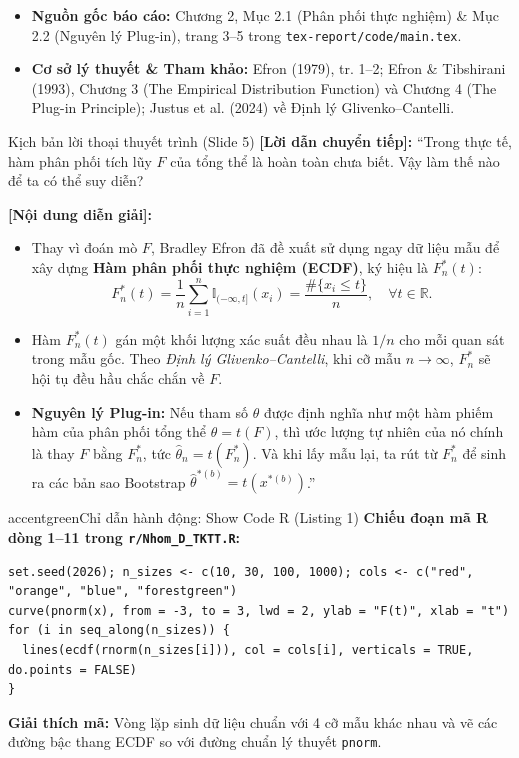 \documentclass[10pt,a4paper]{article}
\begin{document}
\begin{itemize}
    \item \textbf{Nguồn gốc báo cáo:} Chương 2, Mục 2.1 (Phân phối thực nghiệm) \& Mục 2.2 (Nguyên lý Plug-in), trang 3--5 trong \texttt{tex-report/code/main.tex}.
    \item \textbf{Cơ sở lý thuyết \& Tham khảo:} Efron (1979), tr. 1--2; Efron \& Tibshirani (1993), Chương 3 (The Empirical Distribution Function) và Chương 4 (The Plug-in Principle); Justus et al. (2024) về Định lý Glivenko--Cantelli.
\end{itemize}

\begin{scriptbox}{Kịch bản lời thoại thuyết trình (Slide 5)}
    \textbf{[Lời dẫn chuyển tiếp]:} ``Trong thực tế, hàm phân phối tích lũy $F$ của tổng thể là hoàn toàn chưa biết. Vậy làm thế nào để ta có thể suy diễn?
    
    \textbf{[Nội dung diễn giải]:} 
    \begin{itemize}
        \item Thay vì đoán mò $F$, Bradley Efron đã đề xuất sử dụng ngay dữ liệu mẫu để xây dựng \textbf{Hàm phân phối thực nghiệm (ECDF)}, ký hiệu là $F_n^*(t)$:
        \[
        F_n^*(t) = \frac{1}{n}\sum_{i=1}^n \mathbb{I}_{(-\infty,t]}(x_i) = \frac{\#\{x_i \le t\}}{n}, \quad \forall t \in \mathbb{R}.
        \]
        \item Hàm $F_n^*(t)$ gán một khối lượng xác suất đều nhau là $1/n$ cho mỗi quan sát trong mẫu gốc. Theo \textit{Định lý Glivenko--Cantelli}, khi cỡ mẫu $n \to \infty$, $F_n^*$ sẽ hội tụ đều hầu chắc chắn về $F$.
        \item \textbf{Nguyên lý Plug-in:} Nếu tham số $\theta$ được định nghĩa như một hàm phiếm hàm của phân phối tổng thể $\theta = t(F)$, thì ước lượng tự nhiên của nó chính là thay $F$ bằng $F_n^*$, tức $\hat\theta_n = t(F_n^*)$. Và khi lấy mẫu lại, ta rút từ $F_n^*$ để sinh ra các bản sao Bootstrap $\hat\theta^{*(b)} = t(x^{*(b)})$.''
    \end{itemize}
\end{scriptbox}

\begin{actionbox}{accentgreen}{Chỉ dẫn hành động: Show Code R (Listing 1)}
    \textbf{Chiếu đoạn mã R dòng 1--11 trong \texttt{r/Nhom\_D\_TKTT.R}:}
\begin{verbatim}
set.seed(2026); n_sizes <- c(10, 30, 100, 1000); cols <- c("red", "orange", "blue", "forestgreen")
curve(pnorm(x), from = -3, to = 3, lwd = 2, ylab = "F(t)", xlab = "t")
for (i in seq_along(n_sizes)) {
  lines(ecdf(rnorm(n_sizes[i])), col = cols[i], verticals = TRUE, do.points = FALSE)
}
\end{verbatim}
    \textbf{Giải thích mã:} Vòng lặp sinh dữ liệu chuẩn với 4 cỡ mẫu khác nhau và vẽ các đường bậc thang ECDF so với đường chuẩn lý thuyết \texttt{pnorm}.
\end{actionbox}
\end{document}

